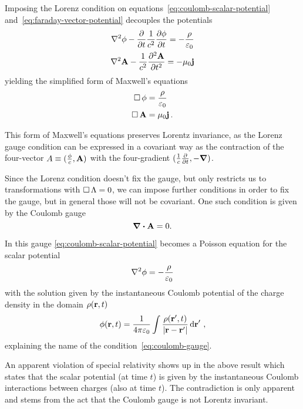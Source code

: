 \documentclass[12pt, class=report, crop=false]{standalone}
\begin{document}
Imposing the Lorenz condition on equations~\eqref{eq:coulomb-scalar-potential}
and~\eqref{eq:faraday-vector-potential} decouples the potentials
\begin{align*}
  \laplacian{\phi} - \pdv{t} \frac{1}{c^2} \pdv{\phi}{t} = -\frac{\rho}{\varepsilon_0} \\
  \laplacian{\vb{A}} - \frac{1}{c^2}\pdv[2]{\vb{A}}{t} = -\mu_0 \vb{j}
\end{align*}
yielding the simplified form of Maxwell's equations
\begin{align*}
  \operatorname{\Box} \phi &= \frac{\rho}{\varepsilon_0} \\
  \operatorname{\Box} \vb{A} &= \mu_0 \vb{j}\,.
\end{align*}

This form of Maxwell's equations preserves Lorentz invariance, as the Lorenz
gauge condition can be expressed in a covariant way as the contraction of the
four-vector \(A \equiv (\frac{\phi}{c}, \vb{A})\) with the four-gradient
\((\frac{1}{c}\pdv{t}, -\grad)\).

Since the Lorenz condition doesn't fix the gauge, but only restricts us to
transformations with \(\operatorname{\Box} \Lambda = 0\), we can impose further conditions
in order to fix the gauge, but in general those will not be covariant.
One such condition is given by the Coulomb gauge
\begin{equation}
  \label{eq:coulomb-gauge}
  \div{\vb{A}} = 0.
\end{equation}

In this gauge \cref{eq:coulomb-scalar-potential} becomes a Poisson equation
for the scalar potential
\begin{equation}
  \label{eq:coulomb-poisson}
  \laplacian{\phi} = -\frac{\rho}{\varepsilon_0}
\end{equation}
with the solution given by the instantaneous Coulomb potential of the charge
density in the domain \(\rho(\vb{r},t)\)
\begin{equation}
  \label{eq:scalar-potential-solution}
  \phi(\vb{r},t) = \frac{1}{4\pi \varepsilon_0} \int \frac{\rho(\vb{r}',t)}{|\vb{r}-\vb{r}'|} \dd{\vb{r}}'\,,
\end{equation}
explaining the name of the condition~\eqref{eq:coulomb-gauge}.

An apparent violation of special relativity shows up in the above result which
states that the scalar potential (at time \(t\)) is given by the instantaneous Coulomb
interactions between charges (also at time \(t\)). The contradiction is only
apparent and stems from the act that the Coulomb gauge is not Lorentz invariant.
\end{document}
